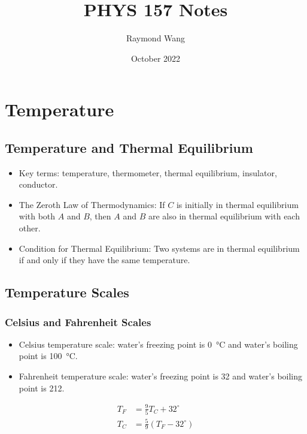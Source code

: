 \documentclass{article}
\title{PHYS 157 Notes}
\author{Raymond Wang}
\date{October 2022}
\begin{document}
\maketitle

\tableofcontents

\section{Temperature}

\subsection{Temperature and Thermal Equilibrium}

\begin{itemize}
    \item Key terms: temperature, thermometer, thermal equilibrium, insulator, conductor.
\end{itemize}

\begin{itemize}
    \item The Zeroth Law of Thermodynamics: If $C$ is initially in thermal equilibrium with both $A$ and $B$, then $A$ and $B$ are also in thermal equilibrium with each other.
    \item Condition for Thermal Equilibrium: Two systems are in thermal equilibrium if and only if they have the same temperature.
\end{itemize}

\subsection{Temperature Scales}

\subsubsection{Celsius and Fahrenheit Scales}

\begin{itemize}
    \item Celsius temperature scale: water's freezing point is \SI{0}{\celsius} and water's boiling point is \SI{100}{\celsius}.
    \item Fahrenheit temperature scale: water's freezing point is \SI{32}{\fahrenheit} and water's boiling point is \SI{212}{\fahrenheit}.
\end{itemize}
\begin{align*}
    T_F &= \frac{9}{5}T_C + 32^\circ \\
    T_C &= \frac{5}{9}(T_F-32^\circ)
\end{align*}
\end{document}
